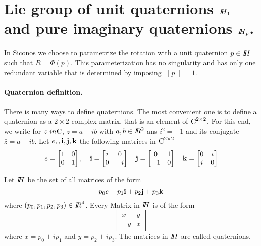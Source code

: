 \section{Lie group of unit quaternions $\mbox{\rm $I\!\!H$}_1$ and pure imaginary quaternions $\mbox{\rm $I\!\!H$}_p$.}


In Siconos we choose to parametrize the rotation with a unit quaternion $p \in \mbox{\rm $I\!\!H$}$ such that $R = \Phi(p)$. This parameterization has no singularity and has only one redundant variable that is determined by imposing $\|p\|=1$.


\paragraph{Quaternion definition.} There is many ways to define quaternions. The most convenient one is to define a quaternion as 
a $2\times 2$ complex matrix, that is an element of $\CC^{2\times 2}$. For this end, we write for $z \ in \CC$, $z=a+ib$ with $a,b \in \mbox{\rm $I\!\!R$}^2$ ans $i^2=-1$ and its conjugate $\bar z= a-ib$. Let ${e, \bf, i, j, k}$ the following matrices in $\CC^{2\times 2}$
\begin{equation}
  \label{eq:127}
  e =
  \begin{bmatrix}
    1 & 0 \\
    0 & 1  \\
  \end{bmatrix},
  \quad   \bf{i} =
  \begin{bmatrix}
    i & 0 \\
    0 & -i  \\
  \end{bmatrix}
  \quad   \bf{j} =
  \begin{bmatrix}
    0 & 1 \\
    -1 & 0  \\
  \end{bmatrix}
   \quad   \bf{k} =
  \begin{bmatrix}
    0 & i \\
    i & 0  \\
  \end{bmatrix}
\end{equation}

\begin{definition}
  Let $\mbox{\rm $I\!\!H$}$ be the set of all matrices of the form
  \begin{equation}
    \label{eq:128}
    p_0 e + p_1 {\bf i} + p_2 {\bf j} + p_3 {\bf k}
  \end{equation}
  where $(p_0,p_1,p_2,p_3) \in \mbox{\rm $I\!\!R$}^4$. Every Matrix in $\mbox{\rm $I\!\!H$}$ is of the form
  \begin{equation}
    \label{eq:129}
    \begin{bmatrix}
      x &y  \\
      - \bar y  & \bar x
    \end{bmatrix}
  \end{equation}
where $x = p_0 + i p_1$ and $y = p_2 + i p_3$. The matrices in $\mbox{\rm $I\!\!H$}$ are called quaternions. 
\end{definition}


